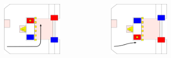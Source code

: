 \documentclass{beamer}
\begin{document}
\begin{frame}
\begin{columns}
\begin{figure}
  \end{figure}
  \begin{figure}
   \includegraphics[scale=0.15]{assets/paths/34_LL}
  \end{figure}
  \begin{figure}
   \includegraphics[scale=0.15]{assets/paths/34_RR}
  \end{figure}
 \end{columns}
\end{frame}
\end{document}
